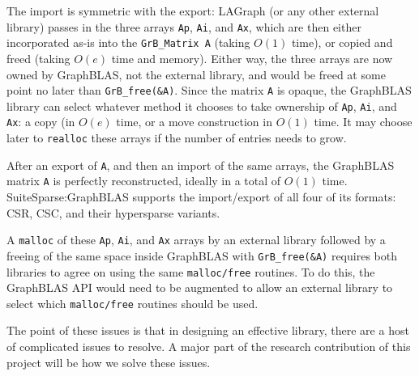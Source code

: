 The import is symmetric with the export:  LAGraph (or any other external
library) passes in the three arrays \verb'Ap', \verb'Ai', and \verb'Ax', which
are then either incorporated as-is into the \verb'GrB_Matrix A' (taking $O(1)$
time), or copied and freed (taking $O(e)$ time and memory).  Either way, the
three arrays are now owned by GraphBLAS, not the external library, and would be
freed at some point no later than \verb'GrB_free(&A)'.  Since the matrix
\verb'A' is opaque, the GraphBLAS library can select whatever method it chooses
to take ownership of \verb'Ap', \verb'Ai', and \verb'Ax': a copy (in $O(e)$
time, or a move construction in $O(1)$ time.  It may choose later to
\verb'realloc' these arrays if the number of entries needs to grow.

After an export of \verb'A', and then an import of the same arrays, the
GraphBLAS matrix \verb'A' is perfectly reconstructed, ideally in a total of
$O(1)$ time.  SuiteSparse:GraphBLAS supports the import/export of all four of
its formats: CSR, CSC, and their hypersparse variants.

A \verb'malloc' of these \verb'Ap', \verb'Ai', and \verb'Ax' arrays by an
external library followed by a freeing of the same space inside GraphBLAS with
\verb'GrB_free(&A)' requires both libraries to agree on using the same
\verb'malloc/free' routines.  To do this, the GraphBLAS API would need to be
augmented to allow an external library to select which \verb'malloc/free'
routines should be used.

The point of these issues is that in designing an effective library, there are a host of 
complicated issues to resolve.  A major part of the research contribution of this project will
be how we solve these issues.

